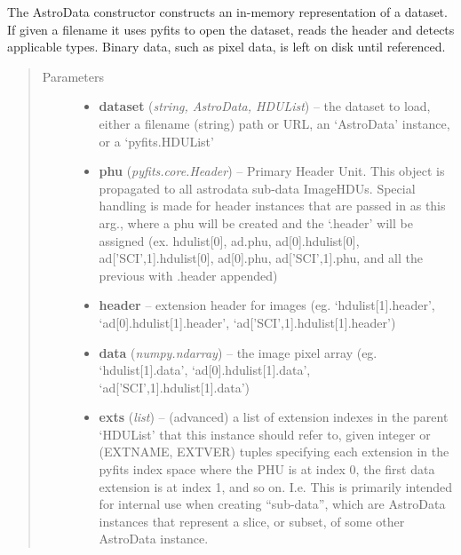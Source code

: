 \documentclass[letterpaper,10pt,english]{sphinxmanual}
\begin{document}
\begin{fulllineitems}
\label{astro_class:astrodata.AstroData.AstroData}
The AstroData constructor constructs an in-memory representation of a
dataset. If given a filename it uses pyfits to open the dataset, reads
the header and detects applicable types. Binary data, such as pixel
data, is left on disk until referenced.
\begin{quote}\begin{description}
\item[{Parameters}] \leavevmode\begin{itemize}
\item {} 
\textbf{dataset} (\emph{string, AstroData, HDUList}) -- the dataset to load, either a filename (string) path
or URL, an `AstroData' instance, or a `pyfits.HDUList'

\item {} 
\textbf{phu} (\emph{pyfits.core.Header}) -- Primary Header Unit. This object is propagated to all 
astrodata sub-data ImageHDUs. Special handling is made 
for header instances that are passed in as this arg., 
where a phu will be created and the `.header' will be 
assigned (ex. hdulist{[}0{]}, ad.phu, ad{[}0{]}.hdulist{[}0{]}, 
ad{[}'SCI',1{]}.hdulist{[}0{]}, ad{[}0{]}.phu, ad{[}'SCI',1{]}.phu, 
and all the previous with .header appended)

\item {} 
\textbf{header} -- extension header for images (eg. `hdulist{[}1{]}.header',
`ad{[}0{]}.hdulist{[}1{]}.header', `ad{[}'SCI',1{]}.hdulist{[}1{]}.header')

\item {} 
\textbf{data} (\emph{numpy.ndarray}) -- the image pixel array (eg. `hdulist{[}1{]}.data',
`ad{[}0{]}.hdulist{[}1{]}.data', `ad{[}'SCI',1{]}.hdulist{[}1{]}.data')

\item {} 
\textbf{exts} (\emph{list}) -- 
(advanced) a list of extension indexes in the parent
`HDUList' that this instance should refer to, given  integer or 
(EXTNAME, EXTVER) tuples specifying each extension in the pyfits
index space where the PHU is at index 0, the first data extension
is at index 1, and so on. I.e. This is primarily intended for 
internal use when creating ``sub-data'', which are AstroData instances
that represent a slice, or subset, of some other AstroData instance.


\end{itemize}
\end{description}
\end{quote}
\end{fulllineitems}
\end{document}
